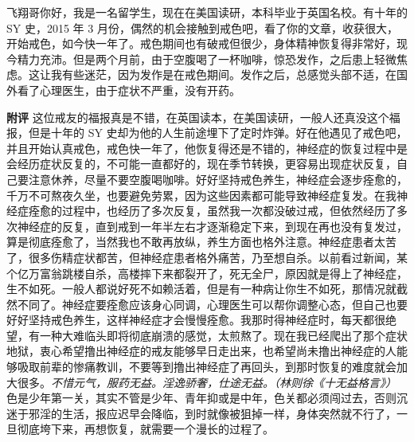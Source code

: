 \begin{case}
    飞翔哥你好，我是一名留学生，现在在美国读研，本科毕业于英国名校。有十年的 SY 史，2015 年 3 月份，偶然的机会接触到戒色吧，看了你的文章，收获很大，开始戒色，如今快一年了。戒色期间也有破戒但很少，身体精神恢复得非常好，现今精力充沛。但是两个月前，由于空腹喝了一杯咖啡，惊恐发作，之后患上轻微焦虑。这让我有些迷茫，因为发作是在戒色期间。发作之后，总感觉头部不适，在国外看了心理医生，由于症状不严重，没有开药。

    \textbf{附评} 这位戒友的福报真是不错，在英国读本，在美国读研，一般人还真没这个福报，但是十年的 SY 史却为他的人生前途埋下了定时炸弹。好在他遇见了戒色吧，并且开始认真戒色，戒色快一年了，他恢复得还是不错的，神经症的恢复过程中是会经历症状反复的，不可能一直都好的，现在季节转换，更容易出现症状反复，自己要注意休养，尽量不要空腹喝咖啡。好好坚持戒色养生，神经症会逐步痊愈的，千万不可熬夜久坐，也要避免劳累，因为这些因素都可能导致神经症复发。在我神经症痊愈的过程中，也经历了多次反复，虽然我一次都没破过戒，但依然经历了多次神经症的反复，直到戒到一年半左右才逐渐稳定下来，到现在再也没有复发过，算是彻底痊愈了，当然我也不敢再放纵，养生方面也格外注意。神经症患者太苦了，很多伤精症状都苦，但神经症患者格外痛苦，乃至想自杀。以前看过新闻，某个亿万富翁跳楼自杀，高楼摔下来都裂开了，死无全尸，原因就是得上了神经症，生不如死。一般人都说好死不如赖活着，但是有一种病让你生不如死，那情况就截然不同了。神经症要痊愈应该身心同调，心理医生可以帮你调整心态，但自己也要好好坚持戒色养生，这样神经症才会慢慢痊愈。我那时得神经症时，每天都很绝望，有一种大难临头即将彻底崩溃的感觉，太煎熬了。现在我已经爬出了那个症状地狱，衷心希望撸出神经症的戒友能够早日走出来，也希望尚未撸出神经症的人能够吸取前辈的惨痛教训，不要等到撸出神经症了再回头，到那时恢复的难度就会加大很多。\textit{不惜元气，服药无益。淫逸骄奢，仕途无益。（林则徐《十无益格言》）} 色是少年第一关，其实不管是少年、青年抑或是中年，色关都必须闯过去，否则沉迷于邪淫的生活，报应迟早会降临，到时就像被狙掉一样，身体突然就不行了，一旦彻底垮下来，再想恢复，就需要一个漫长的过程了。
\end{case}

